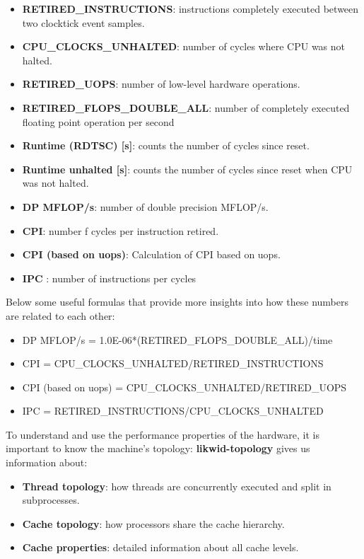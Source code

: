 \documentclass[11pt,a4paper,oneside,titlepage,openright]{book}
\begin{document}
\begin{itemize}
\item{\textbf{RETIRED\_INSTRUCTIONS}: instructions completely executed between two clocktick event samples.}
\item{\textbf{CPU\_CLOCKS\_UNHALTED}: number of cycles where CPU was not halted.}
\item{\textbf{RETIRED\_UOPS}: number of low-level hardware operations.}
\item{\textbf{RETIRED\_FLOPS\_DOUBLE\_ALL}: number of completely executed floating point operation per second  }
\item{\textbf{Runtime (RDTSC) [s]}: counts the number of cycles since reset. }
\item{\textbf{Runtime unhalted [s]}: counts the number of cycles since reset when CPU was not halted.}
\item{\textbf{DP MFLOP/s}:  number of double precision MFLOP/s.}
\item{\textbf{ CPI}: number f cycles per instruction retired.}
\item{\textbf{CPI (based on uops)}: Calculation of CPI based on uops.}
\item{\textbf{ IPC }: number of instructions per cycles}
\end{itemize}

Below some useful formulas that provide more insights into how these numbers are related to each other: 
\begin{itemize}
\item DP MFLOP/s = 1.0E-06*(RETIRED\_FLOPS\_DOUBLE\_ALL)/time
\item CPI = CPU\_CLOCKS\_UNHALTED/RETIRED\_INSTRUCTIONS
\item CPI (based on uops) = CPU\_CLOCKS\_UNHALTED/RETIRED\_UOPS
\item IPC = RETIRED\_INSTRUCTIONS/CPU\_CLOCKS\_UNHALTED
\end{itemize}

To understand and use the performance properties of the hardware, it is important to know the machine's topology: \textbf{likwid-topology} gives us information about: 
\begin{itemize}
\item \textbf{Thread topology}: how threads are concurrently executed and split in subprocesses. 
\item \textbf{Cache topology}: how processors share the cache hierarchy.
\item \textbf{Cache properties}: detailed information about all cache levels.
\end{itemize}
\end{document}
